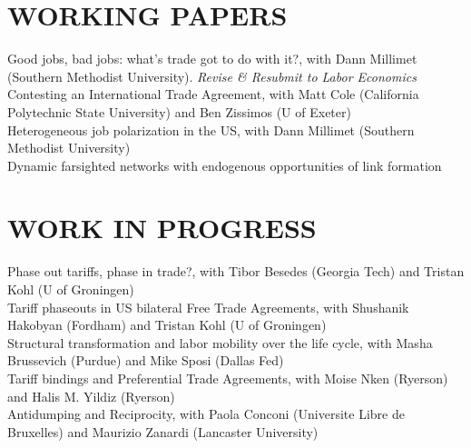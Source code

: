 \documentclass[11pt]{res}
\begin{document}
\begin{resume}
\section{WORKING PAPERS}\vspace{1.5mm}
{Good jobs, bad jobs: what's trade got to do with it?}, with Dann Millimet (Southern Methodist University). \emph{Revise \& Resubmit to Labor Economics}\vspace{1.5mm}\\
{Contesting an International Trade Agreement}, with Matt Cole (California Polytechnic State University) and Ben Zissimos (U of Exeter) \vspace{1.5mm}\\
{Heterogeneous job polarization in the US}, with Dann Millimet (Southern Methodist University)\vspace{1.5mm}\\
{Dynamic farsighted networks with endogenous opportunities of link formation} \vspace{1.5mm}\\

\section{WORK IN PROGRESS}\vspace{1.5mm}
Phase out tariffs, phase in trade?, with Tibor Besedes (Georgia Tech) and Tristan Kohl (U of Groningen) \vspace{1.5mm}\\
Tariff phaseouts in US bilateral Free Trade Agreements, with Shushanik Hakobyan (Fordham) and Tristan Kohl (U of Groningen)\vspace{1.5mm}\\
Structural transformation and labor mobility over the life cycle, with Masha Brussevich (Purdue) and Mike Sposi (Dallas Fed)\vspace{1.5mm}\\
Tariff bindings and Preferential Trade Agreements, with Moise Nken (Ryerson) and Halis M. Yildiz (Ryerson)\vspace{1.5mm}\\
Antidumping and Reciprocity, with Paola Conconi (Universite Libre de Bruxelles) and Maurizio Zanardi (Lancaster University)\\


\end{resume}
\end{document}
